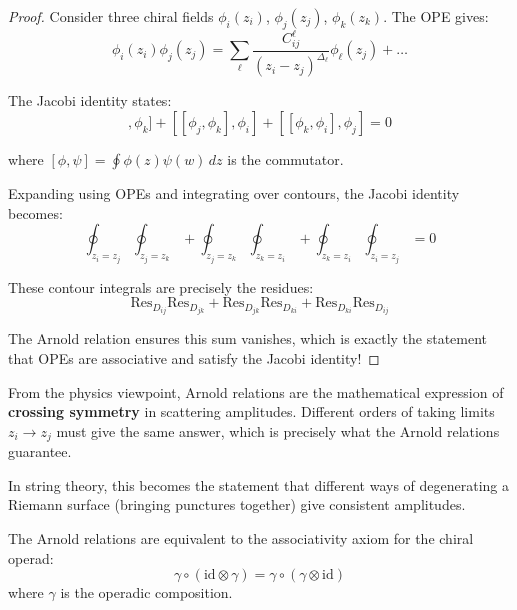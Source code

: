\begin{proof}
Consider three chiral fields $\phi_i(z_i)$, $\phi_j(z_j)$, $\phi_k(z_k)$. The OPE gives:
\begin{equation}
\phi_i(z_i) \phi_j(z_j) = \sum_{\ell} \frac{C_{ij}^{\ell}}{(z_i - z_j)^{\Delta_\ell}} 
\phi_\ell(z_j) + \ldots
\end{equation}

The Jacobi identity states:
\begin{equation}
[[\phi_i, \phi_j], \phi_k] + [[\phi_j, \phi_k], \phi_i] + [[\phi_k, \phi_i], \phi_j] = 0
\end{equation}

where $[\phi, \psi] = \oint \phi(z) \psi(w) \, dz$ is the commutator.

Expanding using OPEs and integrating over contours, the Jacobi identity becomes:
\begin{equation}
\oint_{z_i = z_j} \oint_{z_j = z_k} + \oint_{z_j = z_k} \oint_{z_k = z_i} + 
\oint_{z_k = z_i} \oint_{z_i = z_j} = 0
\end{equation}

These contour integrals are precisely the residues:
\begin{equation}
\text{Res}_{D_{ij}} \text{Res}_{D_{jk}} + \text{Res}_{D_{jk}} \text{Res}_{D_{ki}} + 
\text{Res}_{D_{ki}} \text{Res}_{D_{ij}}
\end{equation}

The Arnold relation ensures this sum vanishes, which is exactly the statement that OPEs 
are associative and satisfy the Jacobi identity!
\end{proof}

\begin{remark}
From the physics viewpoint, Arnold relations are the mathematical expression of 
\textbf{crossing symmetry} in scattering amplitudes. Different orders of taking limits 
$z_i \to z_j$ must give the same answer, which is precisely what the Arnold relations 
guarantee.

In string theory, this becomes the statement that different ways of degenerating a 
Riemann surface (bringing punctures together) give consistent amplitudes.
\end{remark}

\begin{corollary}
\label{cor:arnold-operadic}
The Arnold relations are equivalent to the associativity axiom for the chiral operad:
\begin{equation}
\gamma \circ (\text{id} \otimes \gamma) = \gamma \circ (\gamma \otimes \text{id})
\end{equation}
where $\gamma$ is the operadic composition.
\end{corollary}

